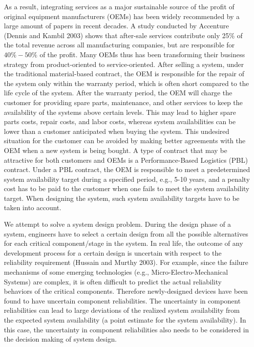\documentclass[preprint,12pt]{elsarticle}
\begin{document}
As a result, integrating services as a major sustainable source of the profit of original equipment manufacturers (OEMs) has been widely recommended by a large amount of papers in recent decades. A study conducted by Accenture (Dennis and Kambil 2003) shows that after-sale services contribute only 25\% of the total revenue across all manufacturing companies, but are responsible for $40\%-50\%$ of the profit. Many OEMs thus has been transforming their business strategy from product-oriented to service-oriented. After selling a system, under the traditional material-based contract, the OEM is responsible for the repair of the system only within the warranty period, which is often short compared to the life cycle of the system. After the warranty period, the OEM will charge the customer for providing spare parts, maintenance, and other services to keep the availability of the systems above certain levels. This may lead to higher spare parts costs, repair costs, and labor costs, whereas system availabilities can be lower than a customer anticipated when buying the system. This undesired situation for the customer can be avoided by making better agreements with the OEM when a new system is being bought. A type of contract that may be attractive for both customers and OEMs is a Performance-Based Logistics (PBL) contract. Under a PBL contract, the OEM is responsible to meet a predetermined system availability target during a specified period, e.g., 5-10 years, and a penalty cost has to be paid to the customer when one fails to meet the system availability target. When designing the system, such system availability targets have to be taken into account.



We attempt to solve a system design problem. During the design phase of a system, engineers have to select a certain design from all the possible alternatives for each critical component/stage in the system. In real life, the outcome of any development process for a certain design is uncertain with respect to the reliability requirement (Hussain and Murthy 2003). For example, since the failure mechanisms of some emerging technologies (e.g., Micro-Electro-Mechanical Systems) are complex, it is often difficult to predict the actual reliability behaviors of the critical components. Therefore newly-designed devices have been found to have uncertain component reliabilities. The uncertainty in component reliabilities can lead to large deviations of the realized system availability from the expected system availability (a point estimate for the system availability). In this case, the uncertainty in component reliabilities also needs to be considered in the decision making of system design.
\end{document}
